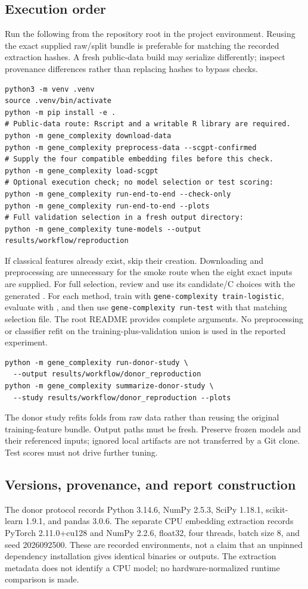 \subsection{Execution order}
Run the following from the repository root in the project environment.
Reusing the exact supplied raw/split bundle is preferable for matching the
recorded extraction hashes. A fresh public-data build may serialize differently;
inspect provenance differences rather than replacing hashes to bypass checks.
\begin{verbatim}
python3 -m venv .venv
source .venv/bin/activate
python -m pip install -e .
# Public-data route: Rscript and a writable R library are required.
python -m gene_complexity download-data
python -m gene_complexity preprocess-data --scgpt-confirmed
# Supply the four compatible embedding files before this check.
python -m gene_complexity load-scgpt
# Optional execution check; no model selection or test scoring:
python -m gene_complexity run-end-to-end --check-only
python -m gene_complexity run-end-to-end --plots
# Full validation selection in a fresh output directory:
python -m gene_complexity tune-models --output results/workflow/reproduction
\end{verbatim}
If classical features already exist, skip their creation. Downloading and
preprocessing are unnecessary for the smoke route when the eight exact inputs
are supplied. For full selection, review  and
use its candidate/C choices with the generated .
For each method, train with \texttt{gene-complexity train-logistic}, evaluate with
, and then use
\texttt{gene-complexity run-test} with that matching selection file. The root README
provides complete arguments. No preprocessing or classifier refit on the
training-plus-validation union is used in the reported experiment.
\begin{verbatim}
python -m gene_complexity run-donor-study \
  --output results/workflow/donor_reproduction
python -m gene_complexity summarize-donor-study \
  --study results/workflow/donor_reproduction --plots
\end{verbatim}
The donor study refits folds from raw data rather than reusing the original
training-feature bundle. Output paths must be fresh. Preserve frozen models
and their referenced inputs; ignored local artifacts are not transferred by a
Git clone. Test scores must not drive further tuning.

\subsection{Versions, provenance, and report construction}
The donor protocol records Python 3.14.6, NumPy 2.5.3, SciPy 1.18.1,
scikit-learn 1.9.1, and pandas 3.0.6. The separate CPU embedding extraction
records PyTorch 2.11.0+cu128 and NumPy 2.2.6, float32, four threads, batch
size 8, and seed 2026092500. These are recorded environments, not a claim
that an unpinned dependency installation gives identical binaries or outputs.
The extraction metadata does not identify a CPU model; no hardware-normalized
runtime comparison is made.

